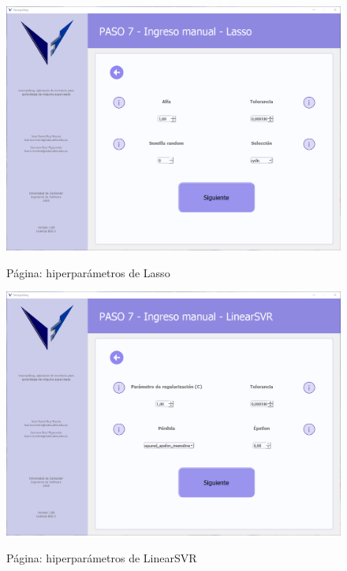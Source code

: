 \begin{figure}[H]
    \centering
    \caption{Página: hiperparámetros de Lasso}
    \includegraphics[width=\textwidth]{views/lasso.png}
    \label{fig:lasso}
\end{figure}

\begin{figure}[H]
    \centering
    \caption{Página: hiperparámetros de LinearSVR}
    \includegraphics[width=\textwidth]{views/linearsvr.png}
    \label{fig:linearsvr}
\end{figure}

